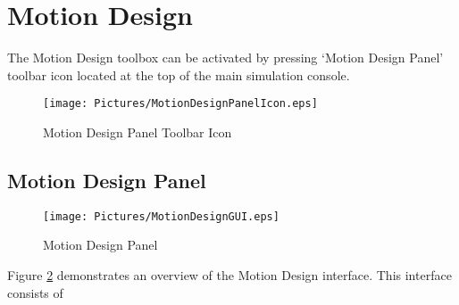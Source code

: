 \documentclass{book}%
\begin{document}
\section{Motion Design}

The Motion Design toolbox can be activated by pressing `Motion Design Panel' toolbar icon located at the top of the main simulation console.

\begin{figure}[htbp]
	\centering
		\texttt{[image: Pictures/MotionDesignPanelIcon.eps]}
	\caption{Motion Design Panel Toolbar Icon}
	\label{fig:MotionDesignPanelIcon}
\end{figure}

\subsection{Motion Design Panel}

\begin{figure}[htbp]
	\centering
		\texttt{[image: Pictures/MotionDesignGUI.eps]}
	\caption{Motion Design Panel}
	\label{fig:MotionDesignGUI}
\end{figure}

Figure \ref{fig:MotionDesignGUI} demonstrates an overview of the Motion Design interface. This interface consists of 
\end{document}
